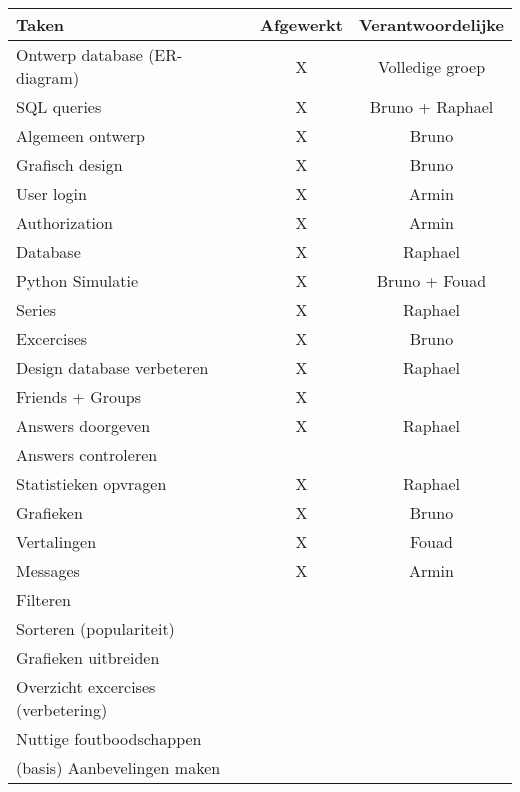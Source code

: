 \begin{tabular}{| l | c | c |}
    \hline
    Taken   &   Afgewerkt   &   Verantwoordelijke \\
    \hline \hline
    Ontwerp database (ER-diagram)   &   X   &   Volledige groep \\
    SQL queries              &   X   &   Bruno + Raphael \\
    Algemeen ontwerp        &   X   &   Bruno   \\
    Grafisch design         &   X   &   Bruno   \\
    User login              &   X   &   Armin   \\
    Authorization           &   X   &   Armin   \\
    Database                &   X   &   Raphael \\
    Python Simulatie        &   X   &   Bruno + Fouad   \\
    Series                  &   X   &   Raphael \\
    Excercises              &   X   &   Bruno   \\
    Design database verbeteren  &   X   &   Raphael \\
    Friends + Groups        &   X   &       \\
    Answers doorgeven       &   X   &   Raphael \\
    Answers controleren     &       &       \\
    Statistieken opvragen   &   X   &   Raphael \\
    Grafieken               &   X   &   Bruno   \\
    Vertalingen             &   X   &   Fouad   \\
    Messages                &   X   &   Armin   \\
    Filteren                &       &       \\
    Sorteren (populariteit) &       &       \\
    Grafieken uitbreiden    &       &       \\
    Overzicht excercises (verbetering)  &       &       \\
    Nuttige foutboodschappen    &       &       \\
    (basis) Aanbevelingen maken &       &       \\
    \hline
\end{tabular}

